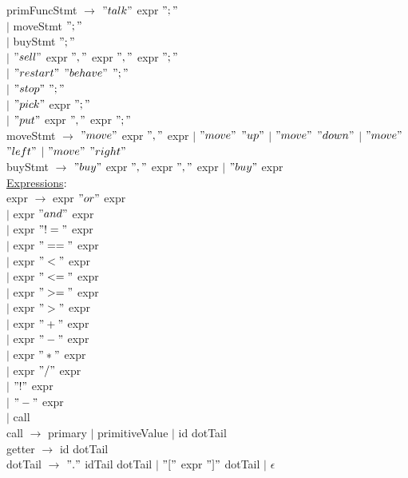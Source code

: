 \documentclass{article}
\begin{document}
primFuncStmt 
$\rightarrow$ $"talk"$ expr $";"$ \\ 
$\vert$  moveStmt $";"$ \\
$\vert$ buyStmt $";"$ \\
$\vert$ $"sell"$ expr $","$ expr $","$ expr $";"$ \\
$\vert$ $"restart"$ $"behave"$ $";"$ \\
$\vert$ $"stop"$ $";"$ \\
$\vert$ $"pick"$ expr $";"$ \\
$\vert$ $"put"$ expr $","$ expr $";"$ \\

moveStmt $\rightarrow$ $"move"$ expr $","$ expr $\vert$ $"move"$ $"up"$ $\vert$ $"move"$ $"down"$ $\vert$ $"move"$ $"left"$ $\vert$ $"move"$ $"right"$ \\

buyStmt $\rightarrow$ $"buy"$ expr $","$ expr $","$ expr $\vert$ $"buy"$  expr\\

\underline{Expressions}: \\

expr $\rightarrow$ expr $"or"$ expr \\
$\vert$ expr $"and"$ expr \\
$\vert$ expr $"!="$ expr \\
$\vert$ expr $"=="$ expr \\
$\vert$ expr $"<"$ expr \\
$\vert$ expr $"<="$ expr \\
$\vert$ expr $">="$ expr \\
$\vert$ expr $">"$ expr \\
$\vert$ expr $"+"$ expr \\
$\vert$ expr $"-"$ expr \\
$\vert$ expr $"*"$ expr \\
$\vert$ expr $"/"$ expr \\
$\vert$ $"!"$ expr \\
$\vert$ $"-"$ expr \\
$\vert$ call \\

call $\rightarrow$ primary $\vert$ primitiveValue $\vert$ id dotTail \\

getter $\rightarrow$ id dotTail \\

dotTail $\rightarrow$ $"."$ idTail dotTail $\vert$ $"["$ expr $"]"$ dotTail $\vert$ $\epsilon$ \\
\end{document}
